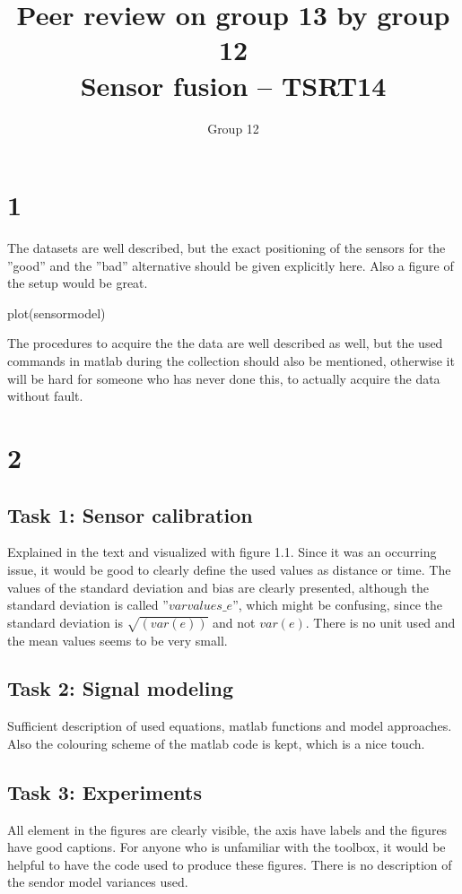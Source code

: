 \documentclass[10pt,a4paper]{report}
\begin{document}
\title{Peer review on group 13 by group 12\\Sensor fusion -- TSRT14}
\author{Group 12}
\maketitle

\newpage
\section*{1}
The datasets are well described, but the exact positioning of the sensors for the ''good'' and the ''bad'' alternative should be given explicitly here.
Also a figure of the setup would be great.
\begin{verbatim*}
plot(sensormodel)
\end{verbatim*}
The procedures to acquire the the data are well described as well, 
but the used commands in matlab during the collection should also be mentioned, 
otherwise it will be hard for someone who has never done this, to actually acquire the data without fault.



\section*{2}
\subsection*{Task 1: Sensor calibration}
Explained in the text and visualized with figure 1.1. 
Since it was an occurring issue, it would be good to clearly define the used values as distance or time. 
The values of the standard deviation and bias are clearly presented, although the standard deviation is called ''$varvalues\_e$'', 
which might be confusing, since the standard deviation is $\sqrt{(var(e))}$ and not $var(e)$.
There is no unit used and the mean values seems to be very small.

\subsection*{Task 2: Signal modeling}
Sufficient description of used equations, matlab functions and model approaches. 
Also the colouring scheme of the matlab code is kept, which is a nice touch.

\subsection*{Task 3: Experiments}
All element in the figures are clearly visible, the axis have labels and the figures have good captions. 
For anyone who is unfamiliar with the toolbox, it would be helpful to have the code used to produce these figures.
There is no description of the sendor model variances used.
\end{document}

